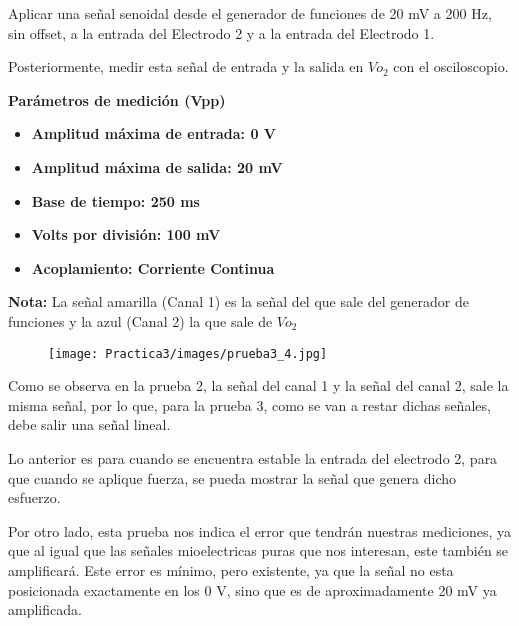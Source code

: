 \documentclass[12pt]{article}
\begin{document}
	Aplicar una señal senoidal desde el generador de funciones de 20 mV a 200 Hz, sin offset, a la entrada del Electrodo 2 y a la entrada del Electrodo 1. 
	
	Posteriormente, medir esta señal de entrada y la salida en $Vo_{2}$ con el osciloscopio.
	
	
	
	\textbf{Parámetros de medición (Vpp)}
            \begin{multicols}{2}
                \begin{itemize}
                    \item[\checkmark] \textbf{Amplitud máxima de entrada: 0 V}
                    \item[\checkmark] \textbf{Amplitud máxima de salida: 20 mV}
                    \item[\checkmark] \textbf{Base de tiempo: 250 ms}
            \columnbreak
                    \item[\checkmark] \textbf{Volts por división: 100 mV}
                    \item[\checkmark] \textbf{Acoplamiento: Corriente Continua}
                \end{itemize}
            \end{multicols}
            
            \textbf{Nota:} La señal amarilla (Canal 1) es la señal del que sale del generador de funciones y la azul (Canal 2) la que sale de $Vo_{2}$
            
	        \begin{figure}[h!]
                \centering
                \texttt{[image: Practica3/images/prueba3\_4.jpg]}
            \end{figure} 
            
            Como se observa en la prueba 2, la señal del canal 1 y la señal del canal 2, sale la misma señal, por lo que, para la prueba 3, como se van a restar dichas señales, debe salir una señal lineal. 
            
            Lo anterior es para cuando se encuentra estable la entrada del electrodo 2, para que cuando se aplique fuerza, se pueda mostrar la señal que genera dicho esfuerzo. 
            
            Por otro lado, esta prueba nos indica el error que tendrán nuestras mediciones, ya que al igual que las señales mioelectricas puras que nos interesan, este también se amplificará. Este error es mínimo, pero existente, ya que la señal no esta posicionada exactamente en los 0 V, sino que es de aproximadamente 20 mV ya amplificada.
	
\end{document}
